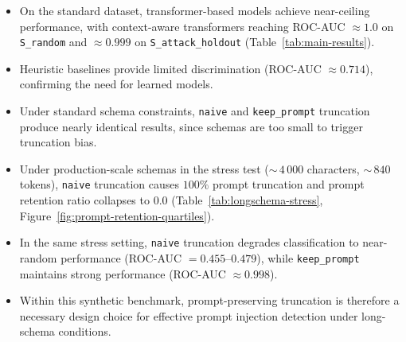 \begin{itemize}
    \item On the standard dataset, transformer-based models achieve near-ceiling performance, with context-aware transformers reaching ROC-AUC $\approx 1.0$ on \texttt{S\_random} and $\approx 0.999$ on \texttt{S\_attack\_holdout} (Table~\ref{tab:main-results}).
    \item Heuristic baselines provide limited discrimination (ROC-AUC $\approx 0.714$), confirming the need for learned models.
    \item Under standard schema constraints, \texttt{naive} and \texttt{keep\_prompt} truncation produce nearly identical results, since schemas are too small to trigger truncation bias.
    \item Under production-scale schemas in the stress test (${\sim}\,4\,000$ characters, ${\sim}\,840$ tokens), \texttt{naive} truncation causes $100\%$ prompt truncation and prompt retention ratio collapses to $0.0$ (Table~\ref{tab:longschema-stress}, Figure~\ref{fig:prompt-retention-quartiles}).
    \item In the same stress setting, \texttt{naive} truncation degrades classification to near-random performance (ROC-AUC $=0.455$--$0.479$), while \texttt{keep\_prompt} maintains strong performance (ROC-AUC $\approx 0.998$).
    \item Within this synthetic benchmark, prompt-preserving truncation is therefore a necessary design choice for effective prompt injection detection under long-schema conditions.
\end{itemize}

